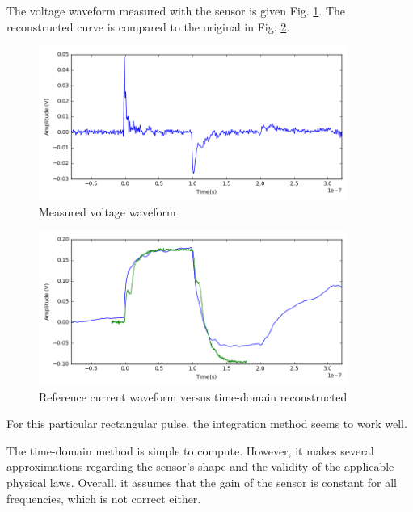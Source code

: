 The voltage waveform measured with the sensor is given Fig. \ref{fig:measurement-nfs}.
The reconstructed curve is compared to the original in Fig. \ref{fig:time-domain-reconstructed}.

\begin{figure}[!h]
  \centering
  \includegraphics[width=0.9\textwidth]{src/3/figures/measured_waveform.png}
  \caption{Measured voltage waveform}
  \label{fig:measurement-nfs}
\end{figure}


\begin{figure}[!h]
  \centering
  \includegraphics[width=0.9\textwidth]{src/3/figures/time_domain_vs_ref.png}
  \caption{Reference current waveform versus time-domain reconstructed}
  \label{fig:time-domain-reconstructed}
\end{figure}

For this particular rectangular pulse, the integration method seems to work well.

The time-domain method is simple to compute.
However, it makes several approximations regarding the sensor's shape and the validity of the applicable physical laws.
Overall, it assumes that the gain of the sensor is constant for all frequencies, which is not correct either.

